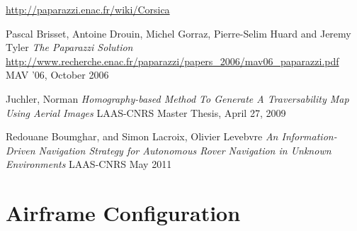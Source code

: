 \documentclass[a4paper,11pt]{report}
\begin{document}
\begin{thebibliography}{9}
  \url{http://paparazzi.enac.fr/wiki/Corsica}

  Pascal Brisset, Antoine Drouin, Michel Gorraz, Pierre-Selim Huard and Jeremy Tyler
  \emph{The Paparazzi Solution}
  \url{http://www.recherche.enac.fr/paparazzi/papers_2006/mav06_paparazzi.pdf}
  MAV '06,
  October 2006

 Juchler, Norman
 \emph{Homography-based Method To Generate A Traversability Map Using Aerial Images}
 LAAS-CNRS Master Thesis,
 April 27, 2009

 Redouane Boumghar, and Simon Lacroix, Olivier Levebvre
 \emph{An Information-Driven Navigation Strategy for Autonomous Rover Navigation in Unknown Environments}
 LAAS-CNRS
 May 2011

\end{thebibliography}

\appendix
\appendixpage
\addappheadtotoc

\chapter{Airframe Configuration}



\lstset{caption=Airframe Configuration}
\end{document}
